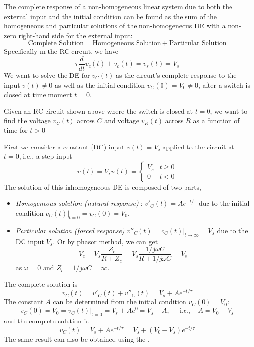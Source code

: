 \documentclass{article}
\begin{document}
The complete response of a non-homogeneous linear system due to both
the external input and the initial condition can be found as the sum of 
the homogeneous and particular solutions of the non-homogeneous DE with 
a non-zero right-hand side for the external input:
\begin{equation}
  \mbox{Complete Solution}=\mbox{Homogeneous Solution}+\mbox{Particular Solution}
\end{equation}
Specifically in the RC circuit, we have
\begin{equation}
  \tau\frac{d}{dt} v_c(t)+v_c(t)=v_s(t)=V_s
\end{equation}
We want to solve the DE for $v_C(t)$ as the circuit's complete response to the
input $v(t)\ne 0$ as well as the initial condition $v_C(0)=V_0\ne 0$, after a 
switch is closed at time moment $t=0$. 



Given an RC circuit shown above where the switch is closed at $t=0$,
we want to find the voltage $v_C(t)$ across $C$ and voltage $v_R(t)$ 
across $R$ as a function of time for $t>0$. 

First we consider a constant (DC) input $v(t)=V_s$ applied to the circuit 
at $t=0$, i.e., a step input 
\begin{equation}
  v(t)=V_s u(t) =\left\{ \begin{array}{ll}V_s & t\ge 0\\0 & t<0\end{array}\right. 
\end{equation}
The solution of this inhomogeneous DE is composed of two parts, 
\begin{itemize}
\item {\em Homogeneous solution (natural response) }: 
  $v'_C(t)=A e^{-t/\tau}$ due to the initial condition
  $v_C(t)\big|_{t=0}=v_C(0)=V_0$.
\item {\em Particular solution (forced response) }
  $v''_C(t)=v_C(t)|_{t\rightarrow \infty}=V_s$ due to the DC input $V_s$.
  Or by phasor method, we can get
  \begin{equation}
    V_c=V_s\frac{Z_c}{R+Z_c}=V_s\frac{1/j\omega C}{R+1/j\omega C}=V_s
  \end{equation}
  as $\omega=0$ and $Z_c=1/j\omega C=\infty$.
\end{itemize}
The complete solution is
\begin{equation}
  v_C(t)=v'_C(t)+v''_C(t)=V_s+A e^{-t/\tau}	
\end{equation}
The constant $A$ can be determined from the initial condition $v_C(0)=V_0$:
\begin{equation}
  v_C(0)=V_0=v_C(t)\big|_{t=0}=V_s+Ae^{0}=V_s+A,
  \;\;\;\;\;\mbox{i.e.,}\;\;\;\;A=V_0-V_s	
\end{equation}
and the complete solution is
\begin{equation}
  v_C(t)=V_s+A e^{-t/\tau}=V_s+(V_0-V_s) e^{-t/\tau}	
\end{equation}
The same result can also be obtained using the 
.
\end{document}
